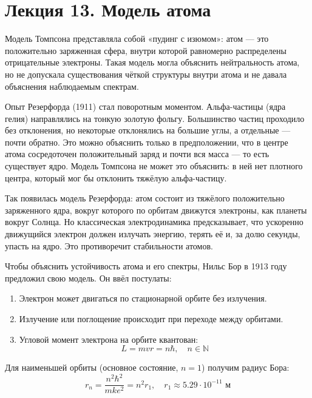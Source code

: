 \documentclass[12pt]{article}
\begin{document}






\section{Лекция 13. Модель атома}

Модель Томпсона представляла собой «пудинг с изюмом»: атом — это положительно заряженная сфера, внутри которой равномерно распределены отрицательные электроны. Такая модель могла объяснить нейтральность атома, но не допускала существования чёткой структуры внутри атома и не давала объяснения наблюдаемым спектрам.

Опыт Резерфорда (1911) стал поворотным моментом. Альфа-частицы (ядра гелия) направлялись на тонкую золотую фольгу. Большинство частиц проходило без отклонения, но некоторые отклонялись на большие углы, а отдельные — почти обратно. Это можно объяснить только в предположении, что в центре атома сосредоточен положительный заряд и почти вся масса — то есть существует ядро. Модель Томпсона не может это объяснить: в ней нет плотного центра, который мог бы отклонить тяжёлую альфа-частицу.

Так появилась модель Резерфорда: атом состоит из тяжёлого положительно заряженного ядра, вокруг которого по орбитам движутся электроны, как планеты вокруг Солнца. Но классическая электродинамика предсказывает, что ускоренно движущийся электрон должен излучать энергию, терять её и, за долю секунды, упасть на ядро. Это противоречит стабильности атомов.

Чтобы объяснить устойчивость атома и его спектры, Нильс Бор в 1913 году предложил свою модель. Он ввёл постулаты:

\begin{enumerate}
    \item Электрон может двигаться по стационарной орбите без излучения.
    \item Излучение или поглощение происходит при переходе между орбитами.
    \item Угловой момент электрона на орбите квантован:
    \[
    L = m v r = n \hbar, \quad n \in \mathbb{N}
    \]
\end{enumerate}

Для наименьшей орбиты (основное состояние, $n = 1$) получим радиус Бора:
\[
r_n = \frac{n^2 \hbar^2}{m k e^2} = n^2 r_1, \quad r_1 \approx 5.29 \cdot 10^{-11} \text{ м}
\]
\end{document}
